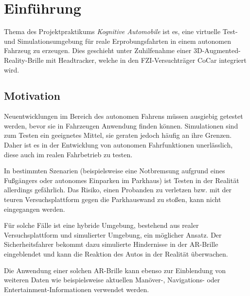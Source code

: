 
\section{Einführung}
\label{einleitung_sec}

Thema des Projektpraktikums \emph{Kognitive Automobile} ist es, eine virtuelle Test- und Simulationsumgebung für reale Erprobungsfahrten in einem autonomen Fahrzeug zu erzeugen.
Dies geschieht unter Zuhilfenahme einer 3D-Augmented-Reality-Brille mit Headtracker, welche in den FZI-Versuchträger CoCar integriert wird.


\subsection{Motivation}
\label{einleitung_motivation_subsec}


Neuentwicklungen im Bereich des autonomen Fahrens müssen ausgiebig getestet werden, bevor sie in Fahrzeugen Anwendung finden können.
Simulationen sind zum Testen ein geeignetes Mittel, sie geraten jedoch häufig an ihre Grenzen.
Daher ist es in der Entwicklung von autonomen Fahrfunktionen unerlässlich, diese auch im realen Fahrbetrieb zu testen.

In bestimmten Szenarien (beispielsweise eine Notbremsung aufgrund eines Fußgängers oder autonomes Einparken im Parkhaus) ist Testen in der Realität allerdings gefährlich.
Das Risiko, einen Probanden zu verletzen bzw. mit der teuren Versuchsplattform gegen die Parkhauswand zu stoßen, kann nicht eingegangen werden.

Für solche Fälle ist eine hybride Umgebung, bestehend aus realer Versuchsplattform und simulierter Umgebung, ein möglicher Ansatz.
Der Sicherheitsfahrer bekommt dazu simulierte Hindernisse in der \ac{AR}-Brille eingeblendet und kann die Reaktion des Autos in der Realität überwachen.

Die Anwendung einer solchen \ac{AR}-Brille kann ebenso zur Einblendung von weiteren Daten wie beispielsweise aktuellen Manöver-, Navigations- oder Entertainment-Informationen verwendet werden.



